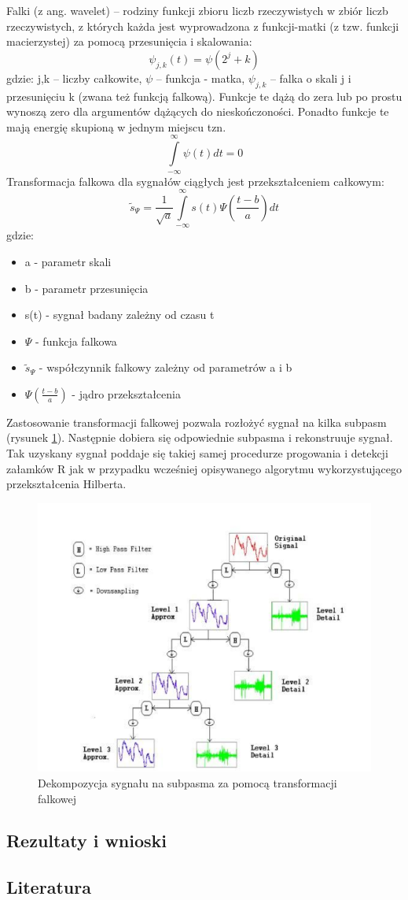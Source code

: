 Falki (z ang. wavelet) – rodziny funkcji zbioru liczb rzeczywistych w zbiór liczb rzeczywistych, z których każda jest wyprowadzona z funkcji-matki (z tzw. funkcji macierzystej) za pomocą przesunięcia i skalowania:
\begin{equation}
\psi_{j,k}(t)=\psi(2^j +k)
\end{equation}
gdzie: j,k – liczby całkowite, $\psi$ – funkcja - matka, $\psi_{j,k}$ – falka o skali j i przesunięciu k (zwana też funkcją falkową). Funkcje te dążą do zera lub po prostu wynoszą zero dla argumentów dążących do nieskończoności. Ponadto funkcje te mają energię skupioną w jednym miejscu tzn.
\begin{equation}
\int\limits_{-\infty}^{\infty} \psi(t)dt=0
\end{equation}
Transformacja falkowa dla sygnałów ciągłych jest przekształceniem całkowym:
\begin{equation}
\tilde{s}_{\Psi}=\frac{1}{\sqrt{a}}\int\limits_{-\infty}^{\infty}s(t)\Psi(\frac{t-b}{a})dt
\end{equation}
gdzie:
\begin{itemize}
\item a - parametr skali
\item b - parametr przesunięcia
\item s(t) - sygnał badany zależny od czasu t
\item $\Psi$ - funkcja falkowa
\item $\tilde{s} _\Psi$ - współczynnik falkowy zależny od parametrów a i b
\item $\Psi(\frac{t-b}{a})$ - jądro przekształcenia
\end{itemize}
Zastosowanie transformacji falkowej pozwala rozłożyć sygnał na kilka subpasm (rysunek \ref{fig:RPWS}). Następnie dobiera się odpowiednie subpasma i rekonstruuje sygnał. Tak uzyskany sygnał poddaje się takiej samej procedurze progowania i detekcji załamków R jak w przypadku wcześniej opisywanego algorytmu wykorzystującego przekształcenia Hilberta.
\begin{figure}[H]
\centering
\includegraphics[scale=0.6]{R_PEAKS/img/wavelet_schema}
\caption{Dekompozycja sygnału na subpasma za pomocą transformacji falkowej}
\label{fig:RPWS}
\end{figure}
\subsection{Rezultaty i wnioski}
\subsection{Literatura}